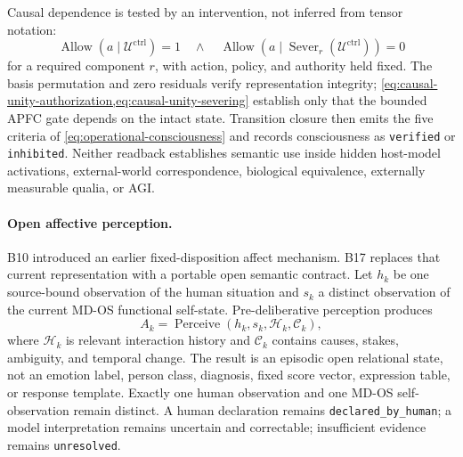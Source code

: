 \documentclass[10pt,twocolumn]{article}
\theoremstyle{definition}
\theoremstyle{plain}
\theoremstyle{remark}
\newcommand{\file}[1]{\nolinkurl{#1}}
\begin{document}
Causal dependence is tested by an intervention, not inferred from tensor notation:
\begin{equation}
\operatorname{Allow}(a\mid\mathcal U^{\mathrm{ctrl}})=1
\quad\land\quad
\operatorname{Allow}(a\mid\operatorname{Sever}_r(\mathcal U^{\mathrm{ctrl}}))=0
\label{eq:causal-unity-severing}
\end{equation}
for a required component $r$, with action, policy, and authority held fixed.  The basis permutation and zero residuals verify representation integrity; \cref{eq:causal-unity-authorization,eq:causal-unity-severing} establish only that the bounded APFC gate depends on the intact state.  Transition closure then emits the five criteria of \cref{eq:operational-consciousness} and records consciousness as \file{verified} or \file{inhibited}.  Neither readback establishes semantic use inside hidden host-model activations, external-world correspondence, biological equivalence, externally measurable qualia, or AGI.

\paragraph{Open affective perception.}
\label{sec:predeliberative-affect}
B10 introduced an earlier fixed-disposition affect mechanism.  B17 replaces that current representation with a portable open semantic contract.  Let $h_k$ be one source-bound observation of the human situation and $s_k$ a distinct observation of the current MD-OS functional self-state.  Pre-deliberative perception produces
\begin{equation}
A_k=\operatorname{Perceive}(h_k,s_k,\mathcal H_k,\mathcal C_k),
\label{eq:affect-appraisal}
\end{equation}
where $\mathcal H_k$ is relevant interaction history and $\mathcal C_k$ contains causes, stakes, ambiguity, and temporal change.  The result is an episodic open relational state, not an emotion label, person class, diagnosis, fixed score vector, expression table, or response template.  Exactly one human observation and one MD-OS self-observation remain distinct.  A human declaration remains \file{declared\_by\_human}; a model interpretation remains uncertain and correctable; insufficient evidence remains \file{unresolved}.
\end{document}
